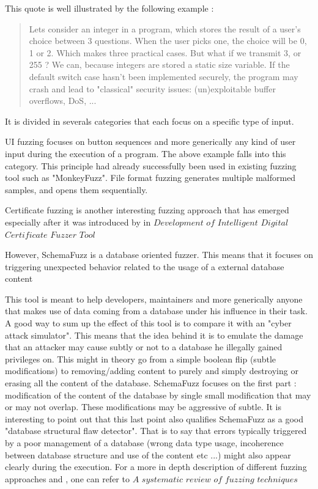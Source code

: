 \documentclass{article}
\begin{document}
\begin{empfile}
This quote is   well illustrated by the following example :
				\begin{quotation}
Lets consider an integer in a program, which stores the result of a user's choice between 3 questions. When the user picks one, the choice will be 0, 1 or 2. Which makes three practical cases. But what if we transmit 3, or 255 ? We can, because integers are stored a static size variable. If the default switch case hasn't been implemented securely, the program may crash and lead to "classical" security issues: (un)exploitable buffer overflows, DoS, ... 
				\end{quotation}

It is divided in severals categories that each focus on a specific type of input.
 
UI fuzzing focuses on button sequences and more generically any kind of user input during the execution of a program. The above example falls into this category.
This principle had already successfully been used in existing fuzzing tool such as  "MonkeyFuzz".
File format fuzzing generates multiple malformed samples, and opens them sequentially.

Certificate fuzzing is another interesting fuzzing approach that has emerged especially after it was introduced by \cite{Certif} in $Development$ $of$ $Intelligent$ $Digital$ $Certificate$ $Fuzzer$ $Tool$

However, SchemaFuzz is a database oriented fuzzer. This means that it focuses on triggering unexpected behavior related to the usage of a external database content   

This tool is meant to help developers, maintainers and more generically anyone that makes use of data coming from a database under his influence in their task. A good way to sum up the effect of this tool is to compare it with an "cyber attack simulator".
This means that the idea behind it is to emulate the damage that an attacker may cause subtly or not to a database he illegally gained privileges on. This might in theory go from a simple boolean flip (subtle modifications) to removing/adding content to purely and simply destroying or erasing all the content of the database.
SchemaFuzz focuses on the first part : modification of the content of the database by single small modification that may or may not overlap. These modifications may be   aggressive of   subtle.
It is interesting to point out that this last point also qualifies SchemaFuzz as a good "database structural flaw detector".
That is to say that errors typically triggered by a poor management of a database (wrong data type usage, incoherence between database structure and use of the content etc ...) might also appear clearly during the execution.
For a more in depth description of different fuzzing approaches and , one can refer to $A$ $systematic$ $review$ $of$ $fuzzing$ $techniques$ \cite{Systematic}

\end{empfile}
\end{document}
